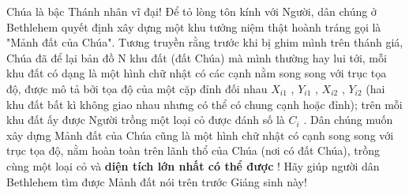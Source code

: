 Chúa là bậc Thánh nhân vĩ đại! Để tỏ lòng tôn kính với Người, dân chúng ở Bethlehem quyết định xây dựng một khu tưởng niệm thật hoành tráng gọi là "Mảnh đất của Chúa". Tương truyền rằng trước khi bị ghim mình trên thánh giá, Chúa đã để lại bản đồ N khu đất (đất Chúa) mà mình thường hay lui tới, mỗi khu đất có dạng là một hình chữ nhật có các cạnh nằm song song với trục tọa độ, được mô tả bởi tọa độ của một cặp đỉnh đối nhau $X_{i1}$ , $Y_{i1}$ , $X_{i2}$ , $Y_{i2}$ (hai khu đất bất kì không giao nhau nhưng có thể có chung cạnh hoặc đỉnh); trên mỗi khu đất ấy được Người trồng một loại cỏ được đánh số là $C_{i}$ . Dân chúng muốn xây dựng Mảnh đất của Chúa cũng là một hình chữ nhật có cạnh song song với trục tọa độ, nằm hoàn toàn trên lãnh thổ của Chúa (nơi có đất Chúa), trồng cùng một loại cỏ và \textbf{ diện tích lớn nhất có thể được } ! Hãy giúp người dân Bethlehem tìm được Mảnh đất nói trên trước Giáng sinh này!